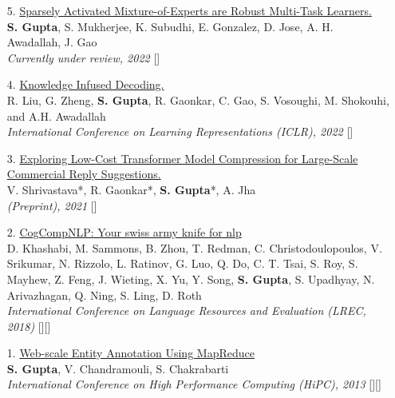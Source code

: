 \begin{itemize}[leftmargin=*]
    \item[5.] \underline{Sparsely Activated Mixture-of-Experts are Robust Multi-Task Learners.}\\ 
    \textbf{S. Gupta}, S. Mukherjee, K. Subudhi, E. Gonzalez, D. Jose, A. H. Awadallah, J. Gao\\
    \textit{Currently under review, 2022}
    \hfill{[]}
    \vspace{1mm}
    \item[4.] \underline{Knowledge Infused Decoding.}\\ 
    R. Liu, G. Zheng, \textbf{S. Gupta}, R. Gaonkar, C. Gao, S. Vosoughi, M. Shokouhi, and A.H. Awadallah\\
    \textit{International Conference on Learning Representations (ICLR), 2022}
    \hfill{[]}
    \vspace{1mm}
    \item[3.] \underline{Exploring Low-Cost Transformer Model Compression for Large-Scale Commercial Reply Suggestions.}\\ 
    V. Shrivastava*, R. Gaonkar*, \textbf{S. Gupta}*, A. Jha\\
    \textit{(Preprint), 2021}
    \hfill{[]}
    \vspace{1mm}
    \item[2.] \underline{CogCompNLP: Your swiss army knife for nlp}\\ 
    D. Khashabi, M. Sammons, B. Zhou, T. Redman, C. Christodoulopoulos, V. Srikumar, N. Rizzolo, L. Ratinov, G. Luo, Q. Do, C. T. Tsai, S. Roy, S. Mayhew, Z. Feng, J. Wieting, X. Yu, Y. Song, \textbf{S. Gupta}, S. Upadhyay, N. Arivazhagan, Q. Ning, S. Ling, D. Roth\\
    \textit{International Conference on Language Resources and Evaluation (LREC, 2018)}
    \hfill{[][]}
    \item[1.] \underline{Web-scale Entity Annotation Using MapReduce}\\ 
    \textbf{S. Gupta}, V. Chandramouli, S. Chakrabarti\\
    \textit{International Conference on High Performance Computing (HiPC), 2013}
    \hfill{[][]}
\end{itemize}
